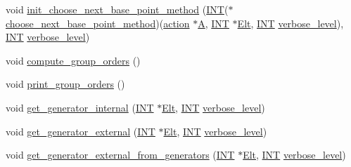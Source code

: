 \begin{DoxyCompactItemize}
void \mbox{\hyperlink{classschreier__sims_a530cf960bf3ce36746fb3c8644d2601f}{init\+\_\+choose\+\_\+next\+\_\+base\+\_\+point\+\_\+method}} (\mbox{\hyperlink{galois_8h_a09fddde158a3a20bd2dcadb609de11dc}{I\+NT}}($\ast$\mbox{\hyperlink{classschreier__sims_a8639b48a416a69dc88c6a1d89aafdc26}{choose\+\_\+next\+\_\+base\+\_\+point\+\_\+method}})(\mbox{\hyperlink{classaction}{action}} $\ast$\mbox{\hyperlink{simeon_8_c_a97833f04c3a9c008df5521a2fc291bb4}{A}}, \mbox{\hyperlink{galois_8h_a09fddde158a3a20bd2dcadb609de11dc}{I\+NT}} $\ast$\mbox{\hyperlink{simeon_8_c_aec1406935bdb1fee3561fcb840964100}{Elt}}, \mbox{\hyperlink{galois_8h_a09fddde158a3a20bd2dcadb609de11dc}{I\+NT}} \mbox{\hyperlink{simeon_8_c_a818073fbcc2f439e7c56952f67386122}{verbose\+\_\+level}}), \mbox{\hyperlink{galois_8h_a09fddde158a3a20bd2dcadb609de11dc}{I\+NT}} \mbox{\hyperlink{simeon_8_c_a818073fbcc2f439e7c56952f67386122}{verbose\+\_\+level}})
\item 
void \mbox{\hyperlink{classschreier__sims_a2a6c775290e7dd8fd4404816dcc23421}{compute\+\_\+group\+\_\+orders}} ()
\item 
void \mbox{\hyperlink{classschreier__sims_ae4e882d0ce297dfede06520229e1de50}{print\+\_\+group\+\_\+orders}} ()
\item 
void \mbox{\hyperlink{classschreier__sims_a8d2feedf9ac36e320ec0999b868a8f7b}{get\+\_\+generator\+\_\+internal}} (\mbox{\hyperlink{galois_8h_a09fddde158a3a20bd2dcadb609de11dc}{I\+NT}} $\ast$\mbox{\hyperlink{simeon_8_c_aec1406935bdb1fee3561fcb840964100}{Elt}}, \mbox{\hyperlink{galois_8h_a09fddde158a3a20bd2dcadb609de11dc}{I\+NT}} \mbox{\hyperlink{simeon_8_c_a818073fbcc2f439e7c56952f67386122}{verbose\+\_\+level}})
\item 
void \mbox{\hyperlink{classschreier__sims_a00f7c9c83b92d582c9a103787b39f1d4}{get\+\_\+generator\+\_\+external}} (\mbox{\hyperlink{galois_8h_a09fddde158a3a20bd2dcadb609de11dc}{I\+NT}} $\ast$\mbox{\hyperlink{simeon_8_c_aec1406935bdb1fee3561fcb840964100}{Elt}}, \mbox{\hyperlink{galois_8h_a09fddde158a3a20bd2dcadb609de11dc}{I\+NT}} \mbox{\hyperlink{simeon_8_c_a818073fbcc2f439e7c56952f67386122}{verbose\+\_\+level}})
\item 
void \mbox{\hyperlink{classschreier__sims_aa8e231e521286bc3e81f42ad850514df}{get\+\_\+generator\+\_\+external\+\_\+from\+\_\+generators}} (\mbox{\hyperlink{galois_8h_a09fddde158a3a20bd2dcadb609de11dc}{I\+NT}} $\ast$\mbox{\hyperlink{simeon_8_c_aec1406935bdb1fee3561fcb840964100}{Elt}}, \mbox{\hyperlink{galois_8h_a09fddde158a3a20bd2dcadb609de11dc}{I\+NT}} \mbox{\hyperlink{simeon_8_c_a818073fbcc2f439e7c56952f67386122}{verbose\+\_\+level}})

\end{DoxyCompactItemize}
